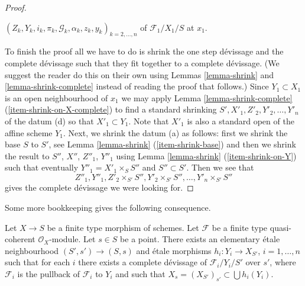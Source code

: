 \begin{proof}
\begin{enumerate}
$(Z_k, Y_k, i_k, \pi_k, \mathcal{G}_k, \alpha_k, z_k, y_k)_{k = 2, \ldots, n}$
of $\mathcal{F}_1/X_1/S$ at $x_1$.
\end{enumerate}
To finish the proof all we have to do is shrink the one step d\'evissage
and the complete d\'evissage such that they fit together to a complete
d\'evissage. (We suggest the reader do this on their own using
Lemmas \ref{lemma-shrink} and
\ref{lemma-shrink-complete}
instead of reading the proof that follows.) Since $Y_1 \subset X_1$
is an open neighbourhood of $x_1$ we may apply
Lemma \ref{lemma-shrink-complete} (\ref{item-shrink-on-X-complete})
to find a standard shrinking $S', X'_1, Z'_2, Y'_2, \ldots, Y'_n$
of the datum (d) so that $X'_1 \subset Y_1$. Note that $X'_1$ is also
a standard open of the affine scheme $Y_1$. Next, we shrink the datum
(a) as follows: first we shrink the base $S$ to $S'$, see
Lemma \ref{lemma-shrink} (\ref{item-shrink-base}) and then
we shrink the result to $S''$, $X''$, $Z''_1$, $Y''_1$ using
Lemma \ref{lemma-shrink} (\ref{item-shrink-on-Y})
such that eventually $Y''_1 = X'_1 \times_S S''$ and $S'' \subset S'$.
Then we see that
$$
Z''_1, Y''_1, Z'_2 \times_{S'} S'', Y'_2 \times_{S'} S'', \ldots,
Y'_n \times_{S'} S''
$$
gives the complete d\'evissage we were looking for.
\end{proof}

\noindent
Some more bookkeeping gives the following consequence.

\begin{lemma}
\label{lemma-existence-complete}
Let $X \to S$ be a finite type morphism of schemes.
Let $\mathcal{F}$ be a finite type quasi-coherent $\mathcal{O}_X$-module.
Let $s \in S$ be a point.
There exists an elementary \'etale neighbourhood
$(S', s') \to (S, s)$ and \'etale morphisms
$h_i : Y_i \to X_{S'}$, $i = 1, \ldots, n$ such that for each
$i$ there exists a complete d\'evissage of $\mathcal{F}_i/Y_i/S'$ over $s'$,
where $\mathcal{F}_i$ is the pullback of $\mathcal{F}_i$ to $Y_i$
and such that $X_s = (X_{S'})_{s'} \subset \bigcup h_i(Y_i)$.
\end{lemma}

